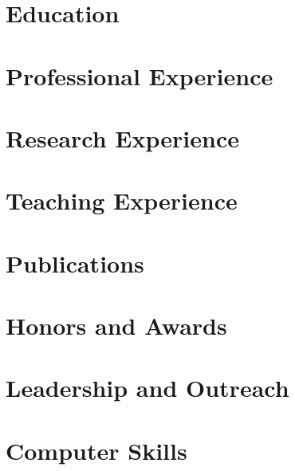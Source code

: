 \documentclass[letterpaper,11pt]{article}
\begin{document}
    

%     

\section{Education}
    
    

\section{Professional Experience}
    
    
    

\section{Research Experience}
    
    

\section{Teaching Experience}
    
    
    
    

\section{Publications}
    

\section{Honors and Awards}
    

\section{Leadership and Outreach}
    

\section{Computer Skills}
    
    
    
\end{document}
